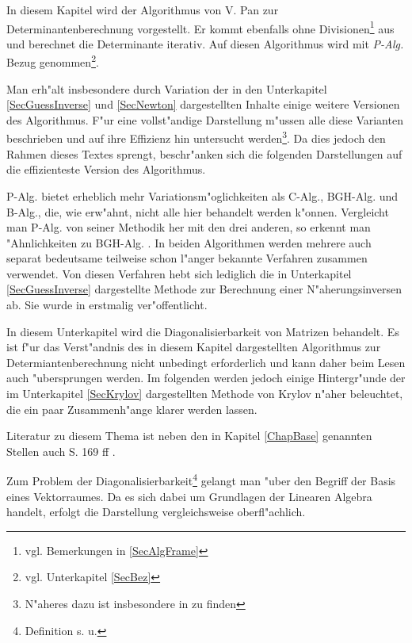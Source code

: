 %
%
\label{ChapPan}
In diesem Kapitel wird der Algorithmus von V. Pan \cite{Pan85} zur 
Determinantenberechnung vorgestellt. Er kommt ebenfalls ohne
Divisionen\footnote{vgl. Bemerkungen in \ref{SecAlgFrame}}
aus und berechnet die Determinante iterativ. Auf diesen Algorithmus wird
mit {\em P-Alg.} Bezug genommen\footnote{vgl. Unterkapitel \ref{SecBez}}.

Man erh"alt insbesondere durch Variation der in den Unterkapitel
\ref{SecGuessInverse} und \ref{SecNewton} dargestellten Inhalte
einige weitere Versionen des Algorithmus.
F"ur eine vollst"andige Darstellung m"ussen alle diese Varianten beschrieben
und auf ihre Effizienz hin untersucht werden\footnote{N"aheres dazu ist 
insbesondere in \cite{PR85a} zu finden}. Da dies jedoch den Rahmen 
dieses Textes sprengt, beschr"anken sich die folgenden Darstellungen auf
die effizienteste Version des Algorithmus.

P-Alg. bietet erheblich mehr Variationsm"oglichkeiten als C-Alg., BGH-Alg.
und B-Alg., die, wie erw"ahnt, nicht alle hier behandelt werden k"onnen.
Vergleicht man P-Alg. von seiner Methodik her mit den drei
anderen, so erkennt man "Ahnlichkeiten zu BGH-Alg. . In beiden Algorithmen
werden mehrere auch separat bedeutsame teilweise schon l"anger bekannte
Verfahren zusammen verwendet. Von diesen Verfahren hebt sich lediglich
die in Unterkapitel \ref{SecGuessInverse} dargestellte Methode zur
Berechnung einer N"aherungsinversen ab. Sie wurde in \cite{Pan85} erstmalig
ver"offentlicht.



In diesem Unterkapitel wird die Diagonalisierbarkeit von Matrizen behandelt.
Es ist f"ur das Verst"andnis des in diesem Kapitel dargestellten Algorithmus
zur Determiantenberechnung nicht unbedingt erforderlich und kann daher beim 
Lesen auch "ubersprungen werden. Im folgenden werden jedoch einige 
Hintergr"unde der im Unterkapitel \ref{SecKrylov} dargestellten Methode von 
Krylov n"aher beleuchtet, die ein paar Zusammenh"ange klarer werden lassen.

Literatur zu diesem 
Thema ist neben den in Kapitel \ref{ChapBase} genannten Stellen
auch \cite{Zurm64} S. 169 ff .

Zum Problem der Diagonalisierbarkeit\footnote{Definition s. u.} gelangt
man "uber den Begriff der Basis eines Vektorraumes. Da es sich dabei
um Grundlagen der Linearen Algebra handelt, erfolgt die Darstellung 
vergleichsweise oberfl"achlich.

